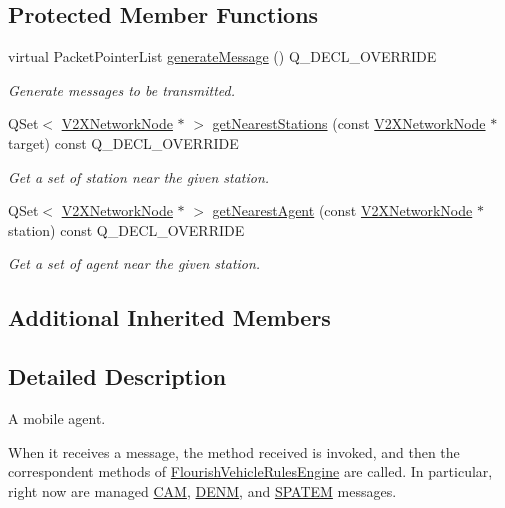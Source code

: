 \subsection*{Protected Member Functions}
\begin{DoxyCompactItemize}
\item 
virtual Packet\+Pointer\+List \hyperlink{classFlourishConnectedAgent_a054a54d45a3f198d6f905f7e1aa87455}{generate\+Message} () Q\+\_\+\+D\+E\+C\+L\+\_\+\+O\+V\+E\+R\+R\+I\+DE
\begin{DoxyCompactList}\small\item\em Generate messages to be transmitted. \end{DoxyCompactList}\item 
Q\+Set$<$ \hyperlink{classV2XNetworkNode}{V2\+X\+Network\+Node} $\ast$ $>$ \hyperlink{classFlourishConnectedAgent_adff45e8deedae13a9eadd63690be58ca}{get\+Nearest\+Stations} (const \hyperlink{classV2XNetworkNode}{V2\+X\+Network\+Node} $\ast$target) const Q\+\_\+\+D\+E\+C\+L\+\_\+\+O\+V\+E\+R\+R\+I\+DE
\begin{DoxyCompactList}\small\item\em Get a set of station near the given station. \end{DoxyCompactList}\item 
Q\+Set$<$ \hyperlink{classV2XNetworkNode}{V2\+X\+Network\+Node} $\ast$ $>$ \hyperlink{classFlourishConnectedAgent_aeb5036c489cc2084fce1a4f49f7a2eda}{get\+Nearest\+Agent} (const \hyperlink{classV2XNetworkNode}{V2\+X\+Network\+Node} $\ast$station) const Q\+\_\+\+D\+E\+C\+L\+\_\+\+O\+V\+E\+R\+R\+I\+DE
\begin{DoxyCompactList}\small\item\em Get a set of agent near the given station. \end{DoxyCompactList}\end{DoxyCompactItemize}
\subsection*{Additional Inherited Members}


\subsection{Detailed Description}
A mobile agent. 

When it receives a message, the method received is invoked, and then the correspondent methods of \hyperlink{classFlourishVehicleRulesEngine}{Flourish\+Vehicle\+Rules\+Engine} are called. In particular, right now are managed \hyperlink{structCAM}{C\+AM}, \hyperlink{structDENM}{D\+E\+NM}, and \hyperlink{structSPATEM}{S\+P\+A\+T\+EM} messages.

